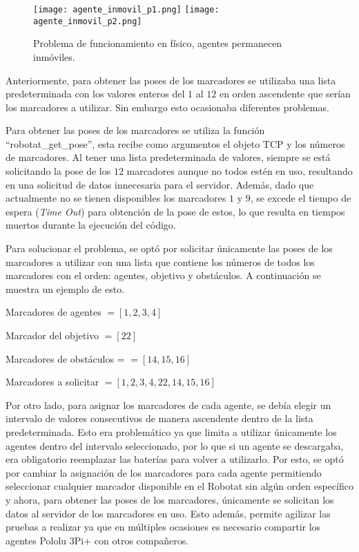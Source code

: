 \begin{figure}[H]
	\centering
	\texttt{[image: agente\_inmovil\_p1.png]}
	\texttt{[image: agente\_inmovil\_p2.png]}
	\caption{Problema de funcionamiento en físico, agentes permanecen inmóviles.}
	\label{fig:agente_inmovil}
\end{figure}

Anteriormente, para obtener las poses de los marcadores se utilizaba una lista predeterminada con los valores enteros del $1$ al $12$ en orden ascendente que serían los marcadores a utilizar. Sin embargo esto ocasionaba diferentes problemas.

Para obtener las poses de los marcadores se utiliza la función ``robotat\_get\_pose'', esta recibe como argumentos el objeto TCP y los números de marcadores. Al tener una lista predeterminada de valores, siempre se está solicitando la pose de los $12$ marcadores aunque no todos estén en uso, resultando en una solicitud de datos innecesaria para el servidor. Además, dado que actualmente no se tienen disponibles los marcadores $1$ y $9$, se excede el tiempo de espera (\textit{Time Out}) para obtención de la pose de estos, lo que resulta en tiempos muertos durante la ejecución del código.

Para solucionar el problema, se optó por solicitar únicamente las poses de los marcadores a utilizar con una lista que contiene los números de todos los marcadores con el orden: agentes, objetivo y obstáculos. A continuación se muestra un ejemplo de esto.

Marcadores de agentes $= [1, 2, 3, 4]$

Marcador del objetivo $ = [22]$

Marcadores de obstáculos = $ = [14, 15, 16]$

Marcadores a solicitar $ = [1, 2, 3, 4, 22, 14, 15, 16]$


Por otro lado, para asignar los marcadores de cada agente, se debía elegir un intervalo  de valores consecutivos de manera ascendente dentro de la lista predeterminada. Esto era problemático ya que limita a utilizar únicamente los agentes dentro del intervalo seleccionado, por lo que si un agente se descargaba, era obligatorio reemplazar las baterías para volver a utilizarlo. Por esto, se optó por cambiar la asignación de los marcadores para cada agente permitiendo seleccionar cualquier marcador disponible en el Robotat sin algún orden específico y ahora, para obtener las poses de los marcadores, únicamente se solicitan los datos al servidor de los marcadores en uso. Esto además, permite agilizar las pruebas a realizar ya que en múltiples ocasiones es necesario compartir los agentes Pololu 3Pi+ con otros compañeros.

